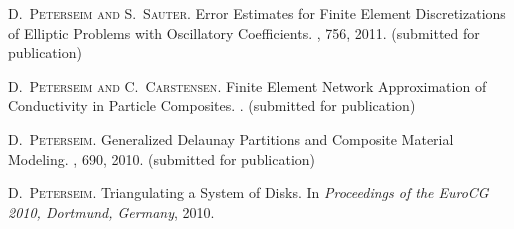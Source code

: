 
\begin{thebibliography}{10}
\textsc{D.~Peterseim and S.~Sauter}.
\newblock Error Estimates for Finite Element Discretizations of Elliptic Problems with Oscillatory Coefficients.
, 756, 2011.
\newblock (submitted for publication)

\textsc{D.~Peterseim and C.~Carstensen}.
\newblock Finite Element Network Approximation of Conductivity in Particle Composites.
.
\newblock (submitted for publication)

\textsc{D.~Peterseim}.
\newblock Generalized {D}elaunay Partitions and Composite Material Modeling.
, 690, 2010.
\newblock (submitted for publication)

\textsc{D.~Peterseim}.
\newblock Triangulating a System of Disks.
\newblock In {\em Proceedings of the EuroCG 2010, Dortmund, Germany}, 2010.
\end{thebibliography}